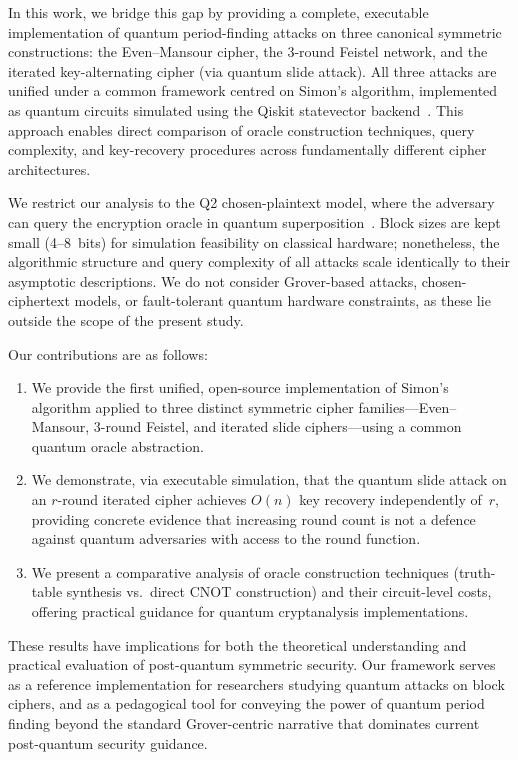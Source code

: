\documentclass[11pt,a4paper]{article}
\begin{document}
In this work, we bridge this gap by providing a complete, executable
implementation of quantum period-finding attacks on three canonical
symmetric constructions: the Even--Mansour cipher, the 3-round Feistel
network, and the iterated key-alternating cipher (via quantum slide
attack).  All three attacks are unified under a common framework centred
on Simon's algorithm, implemented as quantum circuits simulated using the
Qiskit statevector backend~\cite{Qiskit2024}.  This approach enables
direct comparison of oracle construction techniques, query complexity, and
key-recovery procedures across fundamentally different cipher
architectures.

We restrict our analysis to the Q2 chosen-plaintext model, where the
adversary can query the encryption oracle in quantum
superposition~\cite{BonehZhandry2013}.  Block sizes are kept small
(4--8~bits) for simulation feasibility on classical hardware;
nonetheless, the algorithmic structure and query complexity of all
attacks scale identically to their asymptotic descriptions.  We do not
consider Grover-based attacks, chosen-ciphertext models, or
fault-tolerant quantum hardware constraints, as these lie outside the
scope of the present study.

Our contributions are as follows:
\begin{enumerate}
    \item We provide the first unified, open-source implementation of
    Simon's algorithm applied to three distinct symmetric cipher
    families---Even--Mansour, 3-round Feistel, and iterated slide
    ciphers---using a common quantum oracle abstraction.

    \item We demonstrate, via executable simulation, that the quantum
    slide attack on an $r$-round iterated cipher achieves $O(n)$ key
    recovery independently of~$r$, providing concrete evidence that
    increasing round count is not a defence against quantum adversaries
    with access to the round function.

    \item We present a comparative analysis of oracle construction
    techniques (truth-table synthesis vs.\ direct CNOT construction) and
    their circuit-level costs, offering practical guidance for
    quantum cryptanalysis implementations.
\end{enumerate}

These results have implications for both the theoretical understanding
and practical evaluation of post-quantum symmetric security.  Our
framework serves as a reference implementation for researchers studying
quantum attacks on block ciphers, and as a pedagogical tool for
conveying the power of quantum period finding beyond the standard
Grover-centric narrative that dominates current post-quantum security
guidance.
\end{document}
